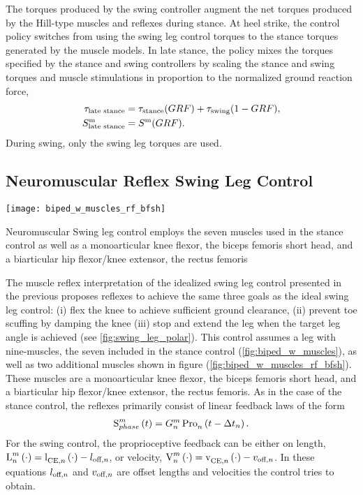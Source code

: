 The torques produced by the swing controller augment the net torques produced by
the Hill-type muscles and reflexes during stance. At heel strike, the control
policy switches from using the swing leg control torques to the stance torques
generated by the muscle models. In late stance, the policy mixes the torques
specified by the stance and swing controllers by scaling the stance and swing
torques and muscle stimulations in proportion to the normalized ground reaction
force,
\begin{align}
    \tau_{\textnormal{late stance}} &= \tau_{\textnormal{stance}}(GRF) +
    \tau_{\textnormal{swing}}(1 - GRF),\\ 
    S^{\textnormal{m}}_\textrm{late stance}  &= S^{\textnormal{m}}(GRF).
\end{align}
During swing, only the swing leg torques are used.

\subsection{Neuromuscular Reflex Swing Leg Control}\label{sec:neuro_muscle_swing}
\begin{marginfigure}
    \centering
    \texttt{[image: biped\_w\_muscles\_rf\_bfsh]}
    \caption{Neuromuscular Swing leg control employs the seven muscles used in
    the stance control as well as a monoarticular knee flexor, the biceps
    femoris short head, and a biarticular hip flexor/knee extensor, the rectus
    femoris} 
    \label{fig:biped_w_muscles_rf_bfsh}
\end{marginfigure} 

The muscle reflex interpretation of the idealized swing leg control presented in
the previous  proposes reflexes to achieve the 
same three goals as the ideal swing leg control: (i) flex the knee to achieve
sufficient ground clearance, (ii) prevent toe scuffing by damping the knee (iii)
stop and extend the leg when the target leg angle is achieved (see
\cref{fig:swing_leg_polar}). This control assumes a leg with nine-muscles, the
seven included in the stance control (\cref{fig:biped_w_muscles}), as well as
two additional muscles shown in figure (\cref{fig:biped_w_muscles_rf_bfsh}).
These muscles are a monoarticular knee flexor, the biceps femoris short head,
and a biarticular hip flexor/knee extensor, the rectus femoris. As in the case
of the stance control, the reflexes primarily consist of linear feedback laws of
the form
\begin{align}
    \func{S}[phase][m]{t} = G_n^m \func{Pro}[n][]{t - \Delta t_n}.
\end{align}
For the swing control, the proprioceptive feedback can be either on length,
$\func{L}[n][m]{\cdot} = \func{l}[\tn{CE},n][]{\cdot} - l_{\tn{off}, n}$,
or velocity, $\func{V}[n][m]{\cdot} = \func{v}[\tn{CE},n][]{\cdot} -
v_{\tn{off}, n}$. In these equations $l_{\textnormal{off},n}$ and $v_{\textnormal{off}, n}$ are
offset lengths and velocities the control tries to obtain.

